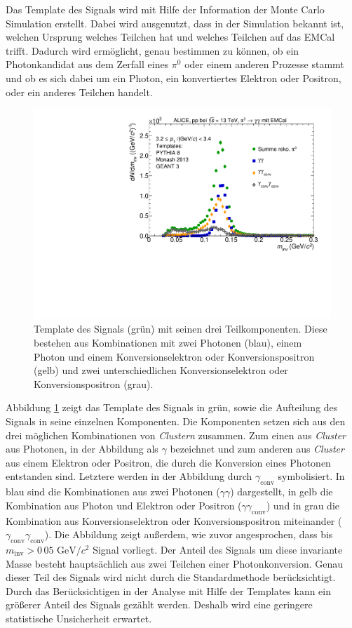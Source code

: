 Das Template des Signals wird mit Hilfe der Information der Monte Carlo Simulation erstellt.
Dabei wird ausgenutzt, dass in der Simulation bekannt ist, welchen Ursprung welches Teilchen hat und welches Teilchen auf das EMCal trifft.
Dadurch wird ermöglicht, genau bestimmen zu können, ob ein Photonkandidat aus dem Zerfall eines $\pi^{0}$ oder einem anderen Prozesse stammt und ob es sich dabei um ein Photon, ein konvertiertes Elektron oder Positron, oder ein anderes Teilchen handelt.
\begin{figure}[tp]
\centering
\includegraphics[width=.75\linewidth]{PeakTemplateMotivation10_Data_2016.pdf}
\caption{Template des Signals (grün) mit seinen drei Teilkomponenten.
Diese bestehen aus Kombinationen mit zwei Photonen (blau), einem Photon und einem Konversionselektron oder Konversionspositron (gelb) und zwei unterschiedlichen Konversionselektron oder Konversionspositron (grau).}
\label{fig:SigTemp}
\end{figure}
\newline
Abbildung \ref{fig:SigTemp} zeigt das Template des Signals in grün, sowie die Aufteilung des Signals in seine einzelnen Komponenten.
Die Komponenten setzen sich aus den drei möglichen Kombinationen von \textit{Clustern} zusammen.
Zum einen aus \textit{Cluster} aus Photonen, in der Abbildung als $\gamma$ bezeichnet und zum anderen aus \textit{Cluster} aus einem Elektron oder Positron, die durch die Konversion  eines Photonen entstanden sind.
Letztere werden in der Abbildung durch $\gamma_\text{conv}$ symbolisiert.
\newline
In blau sind die Kombinationen aus zwei Photonen ($\gamma\gamma$) dargestellt, in gelb die Kombination aus Photon und Elektron oder Positron ($\gamma\gamma_\text{conv}$) und in grau die Kombination aus Konversionselektron oder Konversionspositron miteinander ($\gamma_\text{conv}\gamma_\text{conv}$).
\newline
Die Abbildung zeigt außerdem, wie zuvor angesprochen, dass bis $m_\text{inv}>0\,05 \text{ GeV}/c^{2}$ Signal vorliegt.
Der Anteil des Signals um diese invariante Masse besteht hauptsächlich aus zwei Teilchen einer Photonkonversion.
Genau dieser Teil des Signals wird nicht durch die Standardmethode berücksichtigt.
Durch das Berücksichtigen in der Analyse mit Hilfe der Templates kann ein größerer Anteil des Signals gezählt werden.
Deshalb wird eine geringere statistische Unsicherheit erwartet.